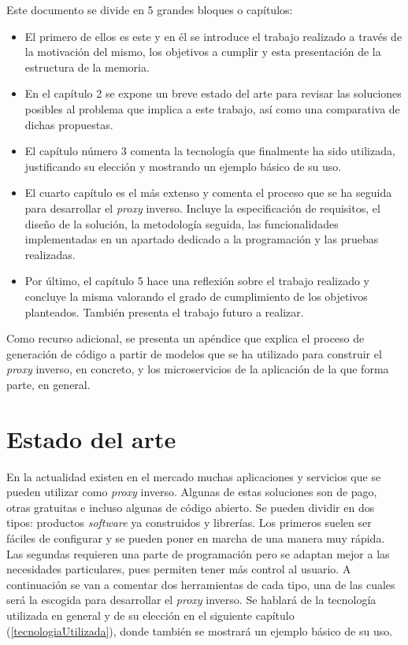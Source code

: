 \documentclass[11pt,spanish,listoffigures]{tfgetsinf}
\begin{document}
Este documento se divide en 5 grandes bloques o capítulos:

\begin{itemize}

	\item El primero de ellos es este y en él se introduce el trabajo realizado a través de la motivación del mismo, los objetivos a cumplir y esta presentación de la estructura de la memoria.

	\item En el capítulo 2 se expone un breve estado del arte para revisar las soluciones posibles al problema que implica a este trabajo, así como una comparativa de dichas propuestas.

	\item El capítulo número 3 comenta la tecnología que finalmente ha sido utilizada, justificando su elección y mostrando un ejemplo básico de su uso.

	\item El cuarto capítulo es el más extenso y comenta el proceso que se ha seguida para desarrollar el \emph{proxy} inverso. Incluye la especificación de requisitos, el diseño de la solución, la metodología seguida, las funcionalidades implementadas en un apartado dedicado a la programación y las pruebas realizadas.

	\item Por último, el capítulo 5 hace una reflexión sobre el trabajo realizado y concluye la misma valorando el grado de cumplimiento de los objetivos planteados. También presenta el trabajo futuro a realizar.

\end{itemize}

Como recurso adicional, se presenta un apéndice que explica el proceso de generación de código a partir de modelos que se ha utilizado para construir el \emph{proxy} inverso, en concreto, y los microservicios de la aplicación de la que forma parte, en general.


\chapter{Estado del arte} \label{estadoDelArte}

En la actualidad existen en el mercado muchas aplicaciones y servicios que se pueden utilizar como \emph{proxy} inverso. Algunas de estas soluciones son de pago, otras gratuitas e incluso algunas de código abierto. Se pueden dividir en dos tipos: productos \emph{software} ya construidos y librerías. Los primeros suelen ser fáciles de configurar y se pueden poner en marcha de una manera muy rápida. Las segundas requieren una parte de programación pero se adaptan mejor a las necesidades particulares, pues permiten tener más control al usuario. A continuación se van a comentar dos herramientas de cada tipo, una de las cuales será la escogida para desarrollar el \emph{proxy} inverso. Se hablará de la tecnología utilizada en general y de su elección en el siguiente capítulo (\ref{tecnologiaUtilizada}), donde también se mostrará un ejemplo básico de su uso.
\end{document}
